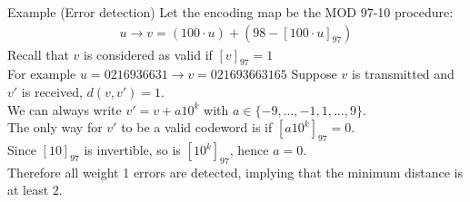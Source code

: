 \begin{parag}{Example (Error detection)}
    Let the encoding map be the MOD 97-10 procedure:
    \begin{align*} u \to v = \left(100 \cdot  u\right) + \left(98 - \left[100 \cdot  u\right]_{97}\right) \end{align*}
    Recall that $v$ is considered as valid if $\left[v\right]_{97} = 1$\\
    For example $u = 0216936631 \to v = 021693663165$
    Suppose $v$ is transmitted and $v'$ is received, $d\left(v, v'\right) = 1$.\\
    We can always write $v' = v + a10^k$ with $a \in \{-9, \ldots, -1, 1, \ldots, 9\}$.\\
    The only way for $v'$ to be a valid codeword is if $\left[a10^k\right]_{97} = 0$.\\
    Since $\left[10\right]_{97}$ is invertible, so is $\left[10^k\right]_{97}$, hence $a = 0$.\\
    Therefore all weight 1 errors are detected, implying that the minimum distance is at least $2$.
\end{parag}


